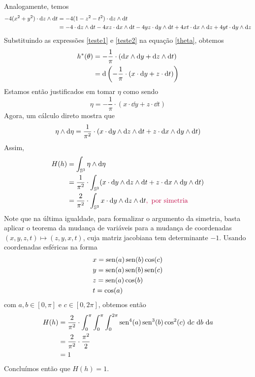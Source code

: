 \begin{dem}
\begin{itemize}
\begin{equation}
\end{equation}
Analogamente, temos
\begin{equation}\label{teste2}
\begin{aligned}
- 4(x^2 + y^2) \cdot \mathrm{d} z \wedge \mathrm{d} t &= -4(1-z^2 -t^2) \cdot \mathrm{d} z \wedge \mathrm{d} t \\
&=-4 \cdot \mathrm{d} z \wedge \mathrm{d} t - 4xz \cdot \mathrm{d} x \wedge \mathrm{d} t - 4yz \cdot \mathrm{d} y \wedge \mathrm{d} t + 4xt \cdot \mathrm{d} x \wedge \mathrm{d} z + 4yt \cdot \mathrm{d} y \wedge \mathrm{d} z
\end{aligned}
\end{equation}
Substituindo as expressões \cref{teste1} e \cref{teste2} na equação \cref{theta}, obtemos
\[ \begin{aligned}
h^{*}(\theta) &= -\frac{1}{\pi} \cdot  (\mathrm{d} x \wedge \mathrm{d} y + \mathrm{d} z \wedge \mathrm{d} t) \\
&= \mathrm{d} \left(-\frac{1}{\pi} \cdot (x \cdot \mathrm{d} y + z \cdot \mathrm{d} t) \right)
\end{aligned}
\]
Estamos então justificados em tomar $\eta$ como sendo
\[
\eta = -\frac{1}{\pi} \cdot (x \cdot \dd y + z \cdot \dd t)
\]
Agora, um cálculo direto mostra que
\[
\eta \wedge \mathrm{d} \eta = \frac{1}{\pi^2} \cdot  (x \cdot \mathrm{d} y \wedge \mathrm{d} z \wedge \mathrm{d} t + z \cdot \mathrm{d} x \wedge \mathrm{d} y \wedge \mathrm{d} t)
\]
Assim,
\begin{align*}
H(h) &= \int_{\mathbb{S}^3} \eta \wedge \mathrm{d} \eta \\
&= \frac{1}{\pi^2} \cdot \int_{\mathbb{S}^3}  (x \cdot \mathrm{d} y \wedge \mathrm{d} z \wedge \mathrm{d} t + z \cdot \mathrm{d} x \wedge \mathrm{d} y \wedge \mathrm{d} t) \\
&=  \frac{2}{\pi^2} \cdot \int_{\mathbb{S}^3}  x \cdot \mathrm{d} y \wedge \mathrm{d} z \wedge \mathrm{d} t \textcolor{purple}{ , \text{ por simetria}}
\end{align*}
Note que na última igualdade, para formalizar o argumento da simetria, basta aplicar o teorema da mudança de variáveis para a mudança de coordenadas $(x, y, z, t) \mapsto (z, y, x, t)$, cuja matriz jacobiana tem determinante $-1$. Usando coordenadas esféricas na forma
\[ \begin{aligned}
&x = \operatorname{sen}(a) \operatorname{sen}(b) \cos(c) \\
&y = \operatorname{sen}(a) \operatorname{sen}(b) \operatorname{sen}(c) \\
&z = \operatorname{sen}(a)\cos(b) \\
&t = \cos(a)
\end{aligned}
\]
com $a, b \in [0, \pi]$ e $c \in [0, 2\pi]$,  obtemos então
\[\begin{aligned}
H(h) &= \frac{2}{\pi^2} \cdot \int_{0}^{\pi} \int_{0}^{\pi} \int_{0}^{2\pi} \operatorname{sen}^4(a) \operatorname{sen}^3(b) \cos^2(c) \ \mathrm{d} c \ \mathrm{d} b \ \mathrm{d} a \\
&=  \frac{2}{\pi^2}  \cdot \frac{\pi^2}{2} \\
&= 1
\end{aligned}
\]
Concluímos então que $H(h) = 1$.
\end{itemize}

\end{dem}

